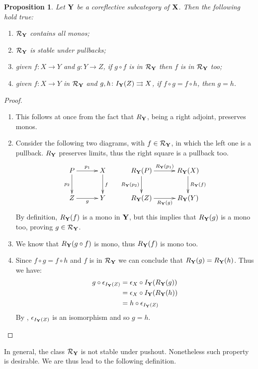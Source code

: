 \documentclass[a4paper]{article}
\def\X{\textbf {\textup{X}}}
\def\Y{\textbf {\textup{Y}}}
\def\Z{\textbf {\textup{Z}}}
\newtheorem{proposition}[theorem]{Proposition}
\theoremstyle{definition}
\begin{document}
 \begin{proposition}
Let $\Y$ be a coreflective subcategory of $\X$. Then the following hold true:
\begin{enumerate}
	\item $\mathcal{R}_\Y$ contains all monos;
	\item $\mathcal{R}_\Y$ is stable under pullbacks;
	\item given $f\colon X\to Y$ and $g\colon Y\to Z$, if $g\circ f$ is in $\mathcal{R}_\Y$ then $f$ is in $\mathcal{R}_\Y$ too;
	\item given $f\colon X\to Y$ in $\mathcal{R}_\Y$ and $g,h\colon I_\Y(Z)\rightrightarrows X$, if $f\circ g = f\circ h$, then $g=h$.
\end{enumerate}
 \end{proposition}
  \begin{proof}\begin{enumerate}
  		\item This follows at once from the fact that $R_\Y$, being a right adjoint, preserves monos.
  		\item Consider the following two diagrams, with $f\in \mathcal{R}_\Y$, in which the left one is a pullback. $R_\Y$ preserves limits, thus the right square is a pullback too.
  		\[\xymatrix@C=30pt{P \ar[r]^{p_1} \ar[d]_{p_2}& X \ar[d]^{f} & R_\Y(P) \ar[r]^{R_\Y(p_1)} \ar[d]_{R_\Y(p_2)} & R_\Y(X) \ar[d]^{R_\Y(f)}\\Z \ar[r]_{g}& Y & R_\Y(Z) \ar[r]_{R_\Y(g)} & R_\Y(Y)}\]
  		By definition, $R_\Y(f)$ is a mono in $\Y$, but this implies that $R_\Y(g)$ is a mono too, proving $g\in \mathcal{R}_\Y$.
  		\item We know that $R_\Y(g\circ f)$ is mono, thus $R_\Y(f)$ is mono too.
  		\item 	Since $f\circ g=f\circ h$ and $f$ is in $\mathcal{R}_\Y$ we can conclude that $R_\Y(g)=R_\Y(h)$. Thus we have:
  		\begin{align*}
  			g\circ \epsilon_{I_\Y(Z)}&=\epsilon_X\circ I_\Y(R_\Y(g))\\&=\epsilon_X\circ I_\Y(R_\Y(h))\\&=h\circ \epsilon_{I_\Y(Z)}
  		\end{align*}
  		By ,  $\epsilon_{I_\Y(Z)}$ is an isomorphism and so $g=h$. \qedhere
  	\end{enumerate}
  \end{proof}

In general, the class $\mathcal{R}_{\Y}$ is not stable under pushout. Nonetheless such property is desirable. We are thus lead to the following definition.
 
\end{document}
